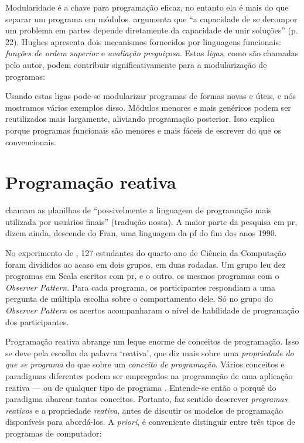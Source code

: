 Modularidade é a chave para programação eficaz, no entanto ela é mais do que
separar um programa em módulos. \textcite{hughes1990} argumenta que “a
capacidade de se decompor um problema em partes depende diretamente da
capacidade de unir soluções” (p. 22). Hughes apresenta dois mecanismos
fornecidos por linguagens funcionais: \emph{funções de ordem superior} e
\emph{avaliação preguiçosa}. Estas \emph{ligas}, como são chamadas pelo autor, podem
contribuir significativamente para a modularização de programas:

\begin{citacao}
  Usando estas ligas pode-se modularizar programas de formas novas e úteis, e
  nós mostramos vários exemplos disso. Módulos menores e mais genéricos podem
  ser reutilizados mais largamente, aliviando programação posterior. Isso
  explica porque programas funcionais são menores e mais fáceis de escrever do
  que os convencionais. \cite[p.~22; tradução nossa]{hughes1990}
\end{citacao}
\section{Programação reativa}
\label{sec:programacao-reativa}

\textcite[p. 52:2]{bainomugisha2013} chamam as planilhas de “possivelmente a
linguagem de programação mais utilizada por usuários finais” (tradução nossa).
A maior parte da pesquisa em \gls{pr}, dizem ainda, descende do Fran, uma
linguagem da \gls{pf} do fim dos anos 1990.

No experimento de \textcite[p. 1125-1134]{salvaneschi2017}, 127 estudantes
do quarto ano de Ciência da Computação foram divididos ao acaso em dois
grupos, em duas rodadas.
Um grupo leu dez programas em Scala escritos com \gls{pr}, e o outro, os mesmos
programas com o \emph{Observer Pattern}.
Para cada programa, os participantes respondiam a uma pergunta de múltipla
escolha sobre o comportamento dele.
Só no grupo do \emph{Observer Pattern} os acertos acompanharam o nível de
habilidade de programação dos participantes.

Programação reativa abrange um leque enorme de conceitos de programação.
Isso se deve pela escolha da palavra ‘reativa’, que diz mais sobre uma
\emph{propriedade do que se programa} do que sobre um \emph{conceito de programação}.
Vários conceitos e paradigmas diferentes podem ser empregados na programação
de uma aplicação reativa — ou de qualquer tipo de programa \cite{vanroy2009}.
Entende-se então o porquê do paradigma abarcar tantos conceitos.
Portanto, faz sentido descrever \emph{programas reativos} e a propriedade
\emph{reativa}, antes de discutir os modelos de programação disponíveis para
abordá-los.
A \emph{priori}, é conveniente distinguir entre três tipos de programas de
computador:

